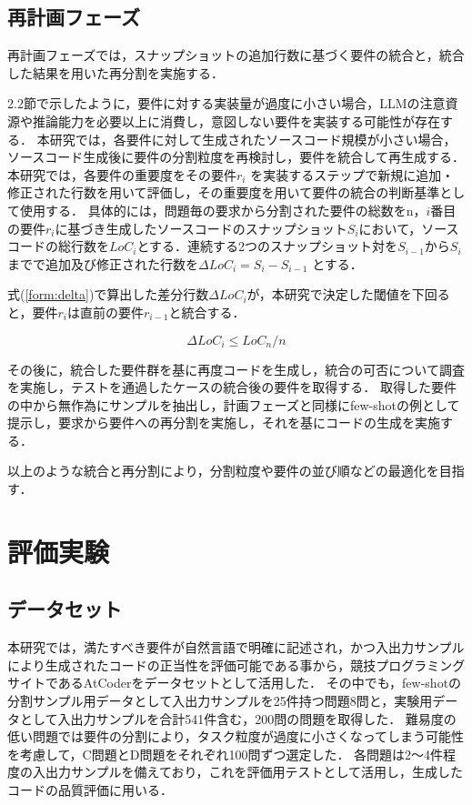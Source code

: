 \documentclass[submit,techrep,noauthor]{ipsj}
\begin{document}
\subsection{再計画フェーズ}
再計画フェーズでは，スナップショットの追加行数に基づく要件の統合と，統合した結果を用いた再分割を実施する．

2.2節で示したように，要件に対する実装量が過度に小さい場合，LLMの注意資源や推論能力を必要以上に消費し，意図しない要件を実装する可能性が存在する\cite{tosem}．
本研究では，各要件に対して生成されたソースコード規模が小さい場合，ソースコード生成後に要件の分割粒度を再検討し，要件を統合して再生成する．
本研究では，各要件の重要度をその要件$r_i$ を実装するステップで新規に追加・修正された行数を用いて評価し，その重要度を用いて要件の統合の判断基準として使用する．
具体的には，問題毎の要求から分割された要件の総数をn，$i$番目の要件$r_i$に基づき生成したソースコードのスナップショット$S_i$において，ソースコードの総行数を$LoC_i$とする．連続する2つのスナップショット対を$S_{i-1}$から$S_i$までで追加及び修正された行数を$\Delta LoC_i = S_i - S_{i-1}$ とする．

式(\ref{form:delta})で算出した差分行数$\Delta LoC_i$が，本研究で決定した閾値を下回ると，要件$r_i$は直前の要件$r_{i-1}$と統合する．

\begin{equation}\label{form:delta}
    \Delta LoC_i \leq LoC_n / n
\end{equation}

その後に，統合した要件群を基に再度コードを生成し，統合の可否について調査を実施し，テストを通過したケースの統合後の要件を取得する．
取得した要件の中から無作為にサンプルを抽出し，計画フェーズと同様にfew-shotの例として提示し，要求から要件への再分割を実施し，それを基にコードの生成を実施する．

以上のような統合と再分割により，分割粒度や要件の並び順などの最適化を目指す．


\section{評価実験}
\label{sec:evaluation}

\subsection{データセット}
本研究では，満たすべき要件が自然言語で明確に記述され，かつ入出力サンプルにより生成されたコードの正当性を評価可能である事から，競技プログラミングサイトであるAtCoderをデータセットとして活用した．
その中でも，few-shotの分割サンプル用データとして入出力サンプルを25件持つ問題8問と，実験用データとして入出力サンプルを合計541件含む，200問の問題を取得した．
難易度の低い問題では要件の分割により，タスク粒度が過度に小さくなってしまう可能性を考慮して，C問題とD問題をそれぞれ100問ずつ選定した．
各問題は2〜4件程度の入出力サンプルを備えており，これを評価用テストとして活用し，生成したコードの品質評価に用いる．
\end{document}
